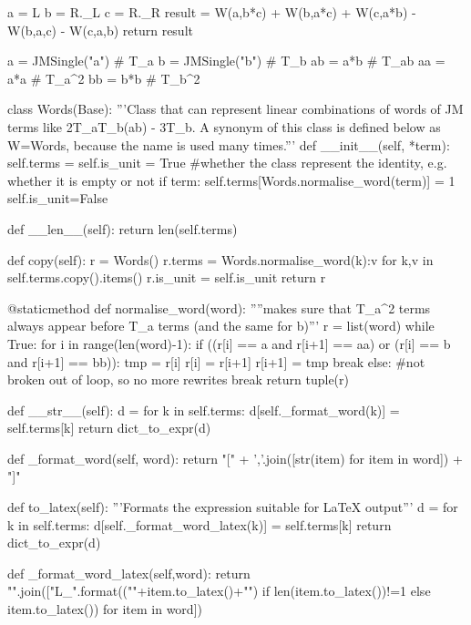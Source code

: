 \documentclass{article}
\begin{document}
\begin{python}
        a = L
        b = R._L
        c = R._R
        result = W(a,b*c) + W(b,a*c) + W(c,a*b) - W(b,a,c) - W(c,a,b)
        return result

a = JMSingle("a")  # T_a
b = JMSingle("b")  # T_b
ab = a*b  # T_{ab}
aa = a*a  # T_{a^2}
bb = b*b  # T_{b^2}

class Words(Base):
    '''Class that can represent linear combinations of words
    of JM terms like 2T_aT_{b(ab)} - 3T_b.
    A synonym of this class is defined below as W=Words,
    because the name is used many times.'''
    def __init__(self, *term):
        self.terms = {}
        self.is_unit = True #whether the class represent the identity, e.g. whether it is empty or not
        if term:
            self.terms[Words.normalise_word(term)] = 1
            self.is_unit=False

    def __len__(self):
        return len(self.terms)

    def copy(self):
        r = Words()
        r.terms = {Words.normalise_word(k):v for k,v in self.terms.copy().items()}
        r.is_unit = self.is_unit
        return r

    @staticmethod
    def normalise_word(word):
        ''''makes sure that T_{a^2} terms always appear before T_a terms (and the same for b)'''
        r = list(word)
        while True:
            for i in range(len(word)-1):
                if ((r[i] == a and r[i+1] == aa) or
                    (r[i] == b and r[i+1] == bb)):
                    tmp = r[i]
                    r[i] = r[i+1]
                    r[i+1] = tmp
                    break
            else: #not broken out of loop, so no more rewrites
                break
        return tuple(r)
        
    def __str__(self):
        d = {}
        for k in self.terms:
            d[self._format_word(k)] = self.terms[k]
        return dict_to_expr(d)

    def _format_word(self, word):
        return "[" + ','.join([str(item) for item in word]) + "]"

    def to_latex(self):
        '''Formats the expression suitable for LaTeX output'''
        d = {}
        for k in self.terms:
            d[self._format_word_latex(k)] = self.terms[k]
        return dict_to_expr(d)

    def _format_word_latex(self,word):
        return "".join(["L_{}".format(("{"+item.to_latex()+"}") if len(item.to_latex())!=1
                                      else item.to_latex()) for item in word])



\end{python}
\end{document}
